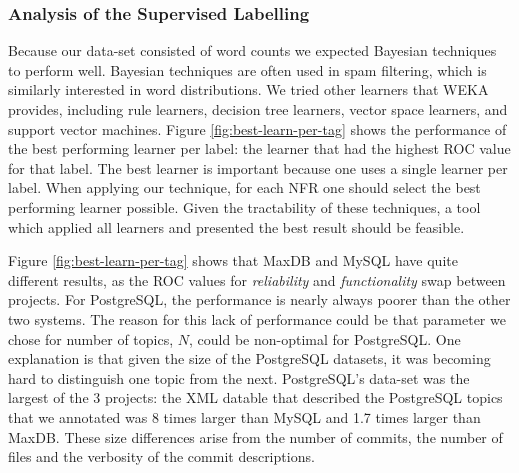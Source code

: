 \documentclass[smallextended]{svjour3}       %
\begin{document}
\subsubsection{Analysis of the Supervised Labelling}
Because our data-set consisted of word counts we expected Bayesian techniques to perform well. Bayesian techniques are often used in spam filtering, which is similarly interested in word distributions. 
We tried other learners that WEKA~\cite{weka09} provides, including rule learners, decision tree learners, vector space learners, and support vector machines.  
Figure \ref{fig:best-learn-per-tag} shows the performance of the best
performing learner per label: 
the learner that had the highest ROC value for that label. 
The best learner is important because one uses a single learner per
label. When applying our technique, for each NFR one should select the
best performing learner possible. Given the tractability of these techniques, a tool which applied all learners and presented the best result should be feasible. 

Figure \ref{fig:best-learn-per-tag} shows that MaxDB and MySQL have
quite different results, as the ROC values for \emph{reliability} and
\emph{functionality} swap between projects. For PostgreSQL, the
performance is nearly always poorer than the other two systems. The
reason for this lack of performance could be that parameter we chose for number of
topics, $N$, could be non-optimal for PostgreSQL. One explanation is that given the size of the PostgreSQL datasets, it was becoming hard to distinguish one topic
from the next. PostgreSQL's data-set was the largest of the 3 projects:
the XML datable that described the PostgreSQL topics that we
annotated was 8 times larger than MySQL and 1.7 times larger than MaxDB. These
size differences arise from the number of commits, the number of files
and the verbosity of the commit descriptions.

\end{document}
